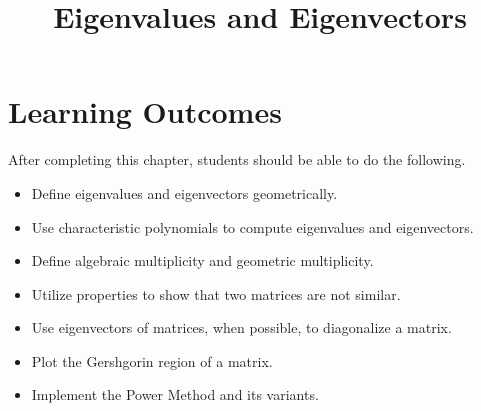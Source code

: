\documentclass{ximera}
\title{Eigenvalues and Eigenvectors}
\begin{document}
\begin{abstract}

\end{abstract}
 
\maketitle
 
\section*{Learning Outcomes}
After completing this chapter, students should be able to do the following.
 
\begin{itemize}
    \item Define eigenvalues and eigenvectors geometrically.
    \item Use characteristic polynomials to compute eigenvalues and eigenvectors.
    \item Define algebraic multiplicity and geometric multiplicity.
    \item Utilize properties to show that two matrices are not similar.   
    \item Use eigenvectors of matrices, when possible, to diagonalize a matrix.
    \item Plot the Gershgorin region of a matrix.
    \item Implement the Power Method and its variants.
\end{itemize}

 
\end{document}
